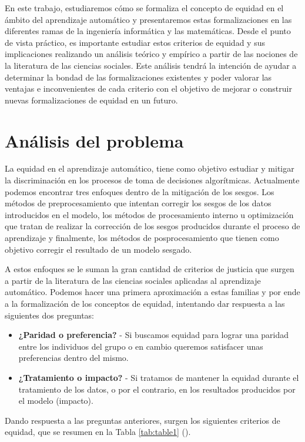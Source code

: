 \documentclass[oneside,openright,titlepage,numbers=noenddot,openany,headinclude,footinclude=true,
cleardoublepage=empty,abstractoff,BCOR=5mm,paper=a4,fontsize=12pt,main=spanish]{scrreprt}
\begin{document}
En este trabajo, estudiaremos cómo se formaliza el concepto de equidad en el ámbito del aprendizaje automático y presentaremos estas formalizaciones en las diferentes ramas de la ingeniería informática y las matemáticas. Desde el punto de vista práctico, es importante estudiar estos criterios de equidad y sus implicaciones realizando un análisis teórico y empírico a partir de las nociones de la literatura de las ciencias sociales. Este análisis tendrá la intención de ayudar a determinar la bondad de las formalizaciones existentes y poder valorar las ventajas e inconvenientes de cada criterio con el objetivo de mejorar o construir nuevas formalizaciones de equidad en un futuro. 

\section{Análisis del problema}

La equidad en el aprendizaje automático, tiene como objetivo estudiar y mitigar la discriminación en los procesos de toma de decisiones algorítmicas. Actualmente podemos encontrar tres enfoques dentro de la mitigación de los sesgos. Los métodos de preprocesamiento que intentan corregir los sesgos de los datos introducidos en el modelo, los métodos de procesamiento interno u optimización que tratan de realizar la corrección de los sesgos producidos durante el proceso de aprendizaje y finalmente, los métodos de posprocesamiento que tienen como objetivo corregir el resultado de un modelo sesgado.

A estos enfoques se le suman la gran cantidad de criterios de justicia que surgen a partir de la literatura de las ciencias sociales aplicadas al aprendizaje automático. Podemos hacer una primera aproximación a estas familias y por ende a la formalización de los conceptos de equidad, intentando dar respuesta a las siguientes dos preguntas:

\begin{itemize}
    \item \textbf{¿Paridad o preferencia?} - Si buscamos equidad para lograr una paridad entre los individuos del grupo o en cambio queremos satisfacer unas preferencias dentro del mismo.
    \item \textbf{¿Tratamiento o impacto?} - Si tratamos de mantener la equidad durante el tratamiento de los datos, o por el contrario, en los resultados producidos por el modelo (impacto).
\end{itemize}

Dando respuesta a las preguntas anteriores, surgen los siguientes criterios de equidad, que se resumen en la Tabla \ref{tab:table1} (\cite{formalizing2018}).\\
\end{document}
